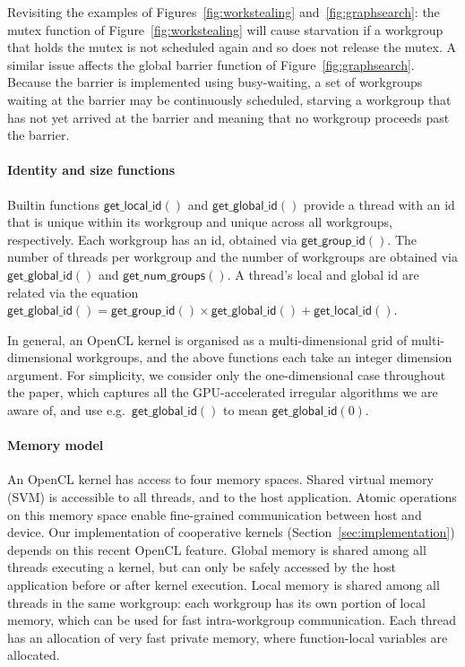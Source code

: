 \documentclass[nocopyrightspace,10pt]{sigplanconf}
\newcommand{\getgroupid}{\mathsf{get\_group\_id}}
\newcommand{\getnumgroups}{\mathsf{get\_num\_groups}}
\newcommand{\getlocalid}{\mathsf{get\_local\_id}}
\newcommand{\getglobalid}{\mathsf{get\_global\_id}}
\newcommand{\getlocalsize}{\mathsf{get\_global\_id}}
\begin{document}
Revisiting the examples of Figures~\ref{fig:workstealing}
and~\ref{fig:graphsearch}: the mutex function of
Figure~\ref{fig:workstealing} will cause starvation if a workgroup
that holds the mutex is not scheduled again and so does not release
the mutex.  A similar issue affects the global barrier function of
Figure~\ref{fig:graphsearch}.  Because the barrier is implemented
using busy-waiting, a set of workgroups waiting at the barrier may be
continuously scheduled, starving a workgroup that has not yet arrived
at the barrier and meaning that no workgroup proceeds past the
barrier.

\paragraph{Identity and size functions}

Builtin functions $\getlocalid()$ and $\getglobalid()$ provide a
thread with an id that is unique within its workgroup and unique
across all workgroups, respectively.  Each workgroup has an id,
obtained via $\getgroupid()$.  The number of threads per workgroup and
the number of workgroups are obtained via $\getlocalsize()$ and
$\getnumgroups()$.  A thread's local and global id are related via the
equation $\getglobalid() = \getgroupid() \times \getlocalsize() +
\getlocalid()$.

In general, an OpenCL kernel is organised as a multi-dimensional grid
of multi-dimensional workgroups, and the above functions each take
an integer dimension argument.  For simplicity, we consider only the
one-dimensional case throughout the paper, which captures all the
GPU-accelerated irregular algorithms we are aware of, and use
e.g.\ $\getglobalid()$ to mean $\getglobalid(0)$.


\paragraph{Memory model}

An OpenCL kernel has access to four memory spaces.  Shared virtual
memory (SVM) is accessible to all threads, and to the host
application.  Atomic operations on this memory space enable
fine-grained communication between host and device.  Our
implementation of cooperative kernels
(Section~\ref{sec:implementation}) depends on this recent OpenCL
feature.  Global memory is shared among all threads executing a
kernel, but can only be safely accessed by the host application before
or after kernel execution.  Local memory is shared among all threads
in the same workgroup: each workgroup has its own portion of local
memory, which can be used for fast intra-workgroup communication.
Each thread has an allocation of very fast private memory, where
function-local variables are allocated.
\end{document}
